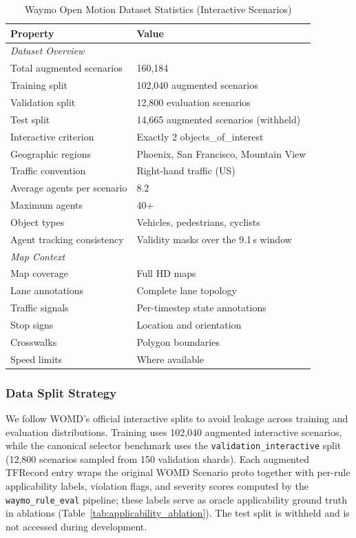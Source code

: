 \begin{table}[t]
\centering
\caption{Waymo Open Motion Dataset Statistics (Interactive Scenarios)}
\label{tab:womd_stats}
\begin{tabular}{ll}
\toprule
\textbf{Property} & \textbf{Value} \\
\midrule
\multicolumn{2}{l}{\textit{Dataset Overview}} \\
Total augmented scenarios & 160,184 \\
Training split & 102,040 augmented scenarios \\
Validation split & 12,800 evaluation scenarios \\
Test split & 14,665 augmented scenarios (withheld) \\
Interactive criterion & Exactly 2 objects\_of\_interest \\
Geographic regions & Phoenix, San Francisco, Mountain View \\
Traffic convention & Right-hand traffic (US) \\
Average agents per scenario & 8.2 \\
Maximum agents & 40+ \\
Object types & Vehicles, pedestrians, cyclists \\
Agent tracking consistency & Validity masks over the 9.1\,s window \\
\midrule
\multicolumn{2}{l}{\textit{Map Context}} \\
Map coverage & Full HD maps \\
Lane annotations & Complete lane topology \\
Traffic signals & Per-timestep state annotations \\
Stop signs & Location and orientation \\
Crosswalks & Polygon boundaries \\
Speed limits & Where available \\
\bottomrule
\end{tabular}
\end{table}

\subsubsection{Data Split Strategy}

We follow WOMD's official interactive splits to avoid leakage across training and evaluation distributions. Training uses 102,040 augmented interactive scenarios, while the canonical selector benchmark uses the \texttt{validation\_interactive} split (12{,}800 scenarios sampled from 150 validation shards). Each augmented TFRecord entry wraps the original WOMD Scenario proto together with per-rule applicability labels, violation flags, and severity scores computed by the \texttt{waymo\_rule\_eval} pipeline; these labels serve as oracle applicability ground truth in ablations (Table~\ref{tab:applicability_ablation}). The test split is withheld and is not accessed during development.


